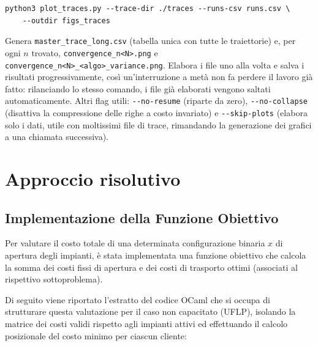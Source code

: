 \documentclass[11pt,a4paper]{article}
\begin{document}
\begin{enumerate}
\begin{verbatim}
python3 plot_traces.py --trace-dir ./traces --runs-csv runs.csv \
    --outdir figs_traces
\end{verbatim}

          Genera \verb|master_trace_long.csv| (tabella unica con tutte le
          traiettorie) e, per ogni $n$ trovato,
          \verb|convergence_n<N>.png| e \verb|convergence_n<N>_<algo>_variance.png|.
          Elabora i file uno alla volta e salva i risultati progressivamente,
          così un'interruzione a metà non fa perdere il lavoro già fatto:
          rilanciando lo stesso comando, i file già elaborati vengono saltati
          automaticamente. Altri flag utili: \verb|--no-resume| (riparte da
          zero), \verb|--no-collapse| (disattiva la compressione delle righe
          a costo invariato) e \verb|--skip-plots| (elabora solo i dati,
          utile con moltissimi file di trace, rimandando la generazione dei
          grafici a una chiamata successiva).
\end{enumerate}


\section{Approccio risolutivo}
\label{sec:approccio}
\subsection{Implementazione della Funzione Obiettivo}

Per valutare il costo totale di una determinata configurazione binaria $x$ di apertura degli impianti, è stata implementata una funzione obiettivo che calcola la somma dei costi fissi di apertura e dei costi di trasporto ottimi (associati al rispettivo sottoproblema). 

Di seguito viene riportato l'estratto del codice OCaml che si occupa di strutturare questa valutazione per il caso non capacitato (UFLP), isolando la matrice dei costi validi rispetto agli impianti attivi ed effettuando il calcolo posizionale del costo minimo per ciascun cliente:
\end{document}
